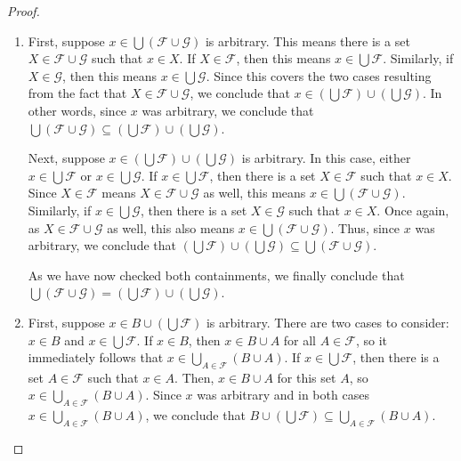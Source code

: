 \documentclass[12pt]{amsart}
\theoremstyle{definition}
\theoremstyle{remark}
\begin{document}
\begin{proof}
\hfill
\begin{enumerate}
	\item First, suppose $x \in \bigcup (\mathcal{F} \cup \mathcal{G})$ is arbitrary.
	This means there is a set $X \in \mathcal{F} \cup \mathcal{G}$ such that $x \in X$.
	If $X \in \mathcal{F}$, then this means $x \in \bigcup \mathcal{F}$.
	Similarly, if $X \in \mathcal{G}$, then this means $x \in \bigcup \mathcal{G}$.
	Since this covers the two cases resulting from the fact that $X \in \mathcal{F} \cup \mathcal{G}$,
	we conclude that $x \in \left( \bigcup \mathcal{F} \right) \cup \left( \bigcup \mathcal{G} \right)$.
	In other words, since $x$ was arbitrary, we conclude that
	$\bigcup (\mathcal{F} \cup \mathcal{G}) \subseteq
	\left( \bigcup \mathcal{F} \right) \cup \left( \bigcup \mathcal{G} \right)$.
	
	Next, suppose $x \in \left( \bigcup \mathcal{F} \right) \cup \left( \bigcup \mathcal{G} \right)$
	is arbitrary.
	In this case, either $x \in \bigcup \mathcal{F}$ or $x \in \bigcup \mathcal{G}$.
	If $x \in \bigcup \mathcal{F}$, then there is a set $X \in \mathcal{F}$ such that $x \in X$.
	Since $X \in \mathcal{F}$ means $X \in \mathcal{F} \cup \mathcal{G}$ as well,
	this means $x \in \bigcup (\mathcal{F} \cup \mathcal{G})$.
	Similarly, if $x \in \bigcup \mathcal{G}$, 
	then there is a set $X \in \mathcal{G}$ such that $x \in X$.
	Once again, as $X \in \mathcal{F} \cup \mathcal{G}$ as well, this also means
	$x \in \bigcup (\mathcal{F} \cup \mathcal{G})$.
	Thus, since $x$ was arbitrary, we conclude that
	$\left( \bigcup \mathcal{F} \right) \cup \left( \bigcup \mathcal{G} \right) \subseteq
	\bigcup (\mathcal{F} \cup \mathcal{G})$.
	
	As we have now checked both containments, we finally conclude that
	$\bigcup (\mathcal{F} \cup \mathcal{G}) =
	\left( \bigcup \mathcal{F} \right) \cup \left( \bigcup \mathcal{G} \right)$.
	
	\item First, suppose $x \in B \cup \left( \bigcup \mathcal{F} \right)$ is arbitrary.
	There are two cases to consider: $x \in B$ and $x \in \bigcup \mathcal{F}$.
	If $x \in B$, then $x \in B \cup A$ for all $A \in \mathcal{F}$, so it immediately follows
	that $x \in \bigcup_{A \in \mathcal{F}} (B \cup A)$.
	If $x \in \bigcup \mathcal{F}$, then there is a set $A \in \mathcal{F}$ such that $x \in A$.
	Then, $x \in B \cup A$ for this set $A$, so $x \in \bigcup_{A \in \mathcal{F}} (B \cup A)$.
	Since $x$ was arbitrary and in both cases $x \in \bigcup_{A \in \mathcal{F}} (B \cup A)$,
	we conclude that $B \cup \left( \bigcup \mathcal{F} \right) \subseteq 
	\bigcup_{A \in \mathcal{F}} (B \cup A)$.
	

\end{enumerate}
\end{proof}
\end{document}
